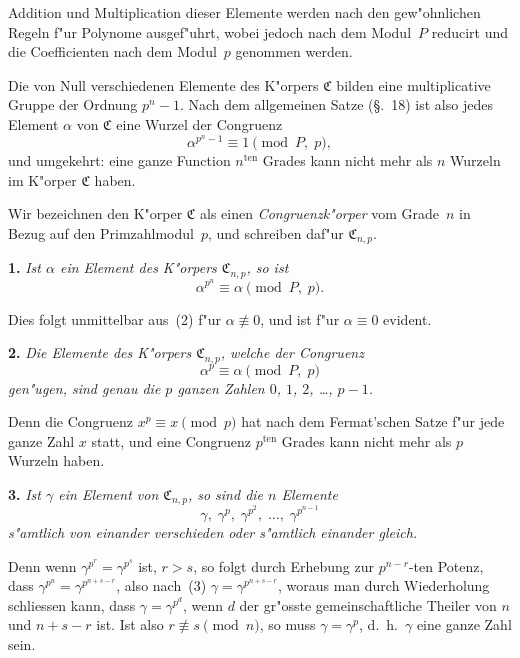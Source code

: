 \documentclass[12pt,a4paper]{article}
\theoremstyle{plain}
\theoremstyle{definition}
\theoremstyle{remark}
\begin{document}
Addition und Multiplication dieser Elemente werden nach den gew"ohnlichen Regeln f"ur Polynome ausgef"uhrt, wobei jedoch nach dem Modul~$P$ reducirt und die Coefficienten nach dem Modul~$p$ genommen werden.

Die von Null verschiedenen Elemente des K"orpers $\mathfrak{C}$ bilden eine multiplicative Gruppe der Ordnung $p^{n} - 1$. Nach dem allgemeinen Satze (\S.~18) ist also jedes Element $\alpha$ von $\mathfrak{C}$ eine Wurzel der Congruenz
\begin{equation}\tag{2}
\alpha^{p^{n}-1} \equiv 1 \pmod{P,\; p},
\end{equation}
und umgekehrt: eine ganze Function $n^{\text{ten}}$ Grades kann nicht mehr als $n$ Wurzeln im K"orper $\mathfrak{C}$ haben.

Wir bezeichnen den K"orper $\mathfrak{C}$ als einen \emph{Congruenzk"orper} vom Grade~$n$ in Bezug auf den Primzahlmodul~$p$, und schreiben daf"ur $\mathfrak{C}_{n,p}$.

\medskip\noindent\textbf{1.} \emph{Ist $\alpha$ ein Element des K"orpers $\mathfrak{C}_{n,p}$, so ist}
\begin{equation}\tag{3}
\alpha^{p^{n}} \equiv \alpha \pmod{P,\; p}.
\end{equation}

Dies folgt unmittelbar aus~(2) f"ur $\alpha \not\equiv 0$, und ist f"ur $\alpha \equiv 0$ evident.

\medskip\noindent\textbf{2.} \emph{Die Elemente des K"orpers $\mathfrak{C}_{n,p}$, welche der Congruenz}
\begin{equation}\tag{4}
\alpha^{p} \equiv \alpha \pmod{P,\; p}
\end{equation}
\emph{gen"ugen, sind genau die $p$ ganzen Zahlen $0$, $1$, $2$, \ldots, $p-1$.}

Denn die Congruenz $x^{p} \equiv x \pmod{p}$ hat nach dem Fermat'schen Satze f"ur jede ganze Zahl $x$ statt, und eine Congruenz $p^{\text{ten}}$ Grades kann nicht mehr als $p$ Wurzeln haben.

\medskip\noindent\textbf{3.} \emph{Ist $\gamma$ ein Element von $\mathfrak{C}_{n,p}$, so sind die $n$ Elemente}
\begin{equation}\tag{5}
\gamma,\; \gamma^{p},\; \gamma^{p^{2}},\; \ldots,\; \gamma^{p^{n-1}}
\end{equation}
\emph{s"amtlich von einander verschieden oder s"amtlich einander gleich.}

Denn wenn $\gamma^{p^{r}} = \gamma^{p^{s}}$ ist, $r > s$, so folgt durch Erhebung zur $p^{n-r}$-ten Potenz, dass $\gamma^{p^{n}} = \gamma^{p^{n+s-r}}$, also nach~(3) $\gamma = \gamma^{p^{n+s-r}}$, woraus man durch Wiederholung schliessen kann, dass $\gamma = \gamma^{p^{d}}$, wenn $d$ der gr"osste gemeinschaftliche Theiler von $n$ und $n + s - r$ ist. Ist also $r \not\equiv s \pmod{n}$, so muss $\gamma = \gamma^{p}$, d.~h.\ $\gamma$ eine ganze Zahl sein.
\end{document}
